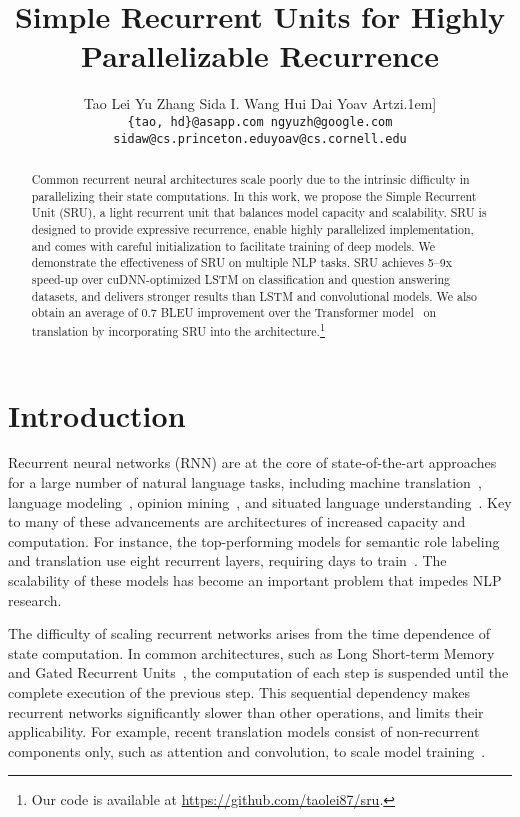 \documentclass[11pt,a4paper]{article}
\title{Simple Recurrent Units for Highly Parallelizable Recurrence}
\author{
Tao Lei  Yu Zhang  Sida I. Wang  Hui Dai  Yoav Artzi\0.1em]
\begin{tabular}{c@{~~~~~~~~~~~~~~~~~~}c}
{\tt \{tao, hd\}@asapp.com } & {\tt ngyuzh@google.com}\\
{\tt sidaw@cs.princeton.edu} & {\tt yoav@cs.cornell.edu}
\end{tabular}
}
\date{}
\newcommand{\yae}[2]{{#1}{#2}}
\begin{document}
\maketitle

\begin{abstract}
Common recurrent neural architectures scale poorly due to the intrinsic difficulty in parallelizing their state computations. In this work, we propose the Simple Recurrent Unit (SRU), a light recurrent unit that balances model capacity and scalability. 
SRU is designed to provide expressive recurrence, enable highly parallelized implementation, and comes with careful initialization to facilitate training of deep models.
We demonstrate the effectiveness of SRU on multiple NLP tasks. SRU achieves 5--9x speed-up over cuDNN-optimized LSTM on classification and question answering datasets, and delivers stronger results than LSTM and convolutional models. 
We also obtain an average of 0.7 BLEU improvement over the Transformer model~\citep{vaswani2017attention} on translation by incorporating SRU into the architecture.\footnote{Our code is available at \url{https://github.com/taolei87/sru}.}


%
 \end{abstract}


\section{Introduction}
\label{sec:intro}






Recurrent neural networks (RNN) are at the core of state-of-the-art approaches for a large number of natural language tasks, including machine translation~\citep{cho-al-emnlp14,Bahdanau:14neuralmt,jean15,luong2015:EMNLP}, language modeling~\citep{zaremba2014recurrent,Gal2016Theoretically,zoph2016neural}, opinion mining~\citep{Irsoy:14opinion}, and situated language understanding~\citep{Mei:16neuralnavi,Misra:17instructions,Suhr:18context,Suhr:18situated}.
Key to many of these advancements are architectures of increased capacity and computation. 
For instance, the top-performing models for semantic role labeling and translation use eight recurrent layers, requiring days to train~\citep{he2017deep,wu2016gnmt}.
The scalability of these models has become an important problem that impedes NLP research.

The difficulty of scaling recurrent networks arises from the time dependence of state computation.
In common architectures, such as Long Short-term Memory~\cite[LSTM;][]{hochreiter1997long} and Gated Recurrent Units~\cite[GRU;][]{cho-al-emnlp14}, the computation of each step is suspended until the complete execution of the previous step. 
This sequential dependency makes recurrent networks significantly slower than other operations, and limits their applicability. 
\yae{For example, recent translation models consist of non-recurrent components only, such as attention and convolution, to scale model training~\citep{gehring2017convolutional,vaswani2017attention}.}{}
\end{document}
